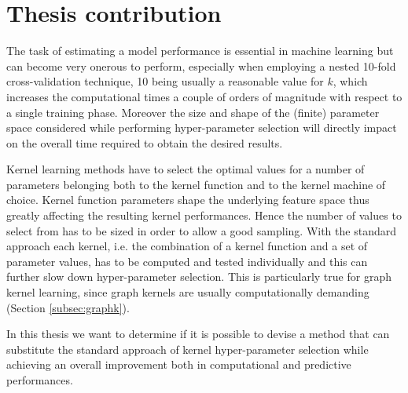 \section{Thesis contribution}
The task of estimating a model performance is essential in machine learning
but can become very onerous to perform, especially when employing a nested 10-fold
cross-validation technique, 10 being usually a reasonable value for $k$, which
increases the computational times a couple of orders of magnitude with respect
to a single training phase.
Moreover the size and shape of the (finite) parameter space considered while performing
hyper-parameter selection will directly impact on the overall time required to
obtain the desired results.


Kernel learning methods have to select the optimal values for a number of parameters
belonging both to the kernel function and to the kernel machine of choice.
Kernel function parameters shape the underlying feature space thus greatly affecting
the resulting kernel performances. Hence the number of values to select from has
to be sized in order to allow a good sampling.
With the standard approach each kernel, i.e. the combination of a kernel function
and a set of parameter values, has to be computed and tested individually and this can
further slow down hyper-parameter selection.
This is particularly true for graph kernel learning, since graph kernels are usually
computationally demanding (Section \ref{subsec:graphk}).

In this thesis we want to determine if it is possible to devise a method that can 
substitute the standard approach of kernel hyper-parameter selection while achieving an
overall improvement both in computational and predictive performances.


